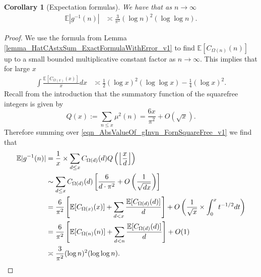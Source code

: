 \documentclass[11pt,reqno,a4letter]{article}
\numberwithin{figure}{section}
\numberwithin{table}{section}
\newcommand{\Floor}[2]{\ensuremath{\left\lfloor \frac{#1}{#2} \right\rfloor}}
\theoremstyle{plain}
\newtheorem{cor}[theorem]{Corollary}
\numberwithin{theorem}{section}
\theoremstyle{definition}
\begin{document}
\begin{cor}[Expectation formulas] 
\label{cor_ExpectationFormulaAbsgInvn_v2} 
We have that as $n \rightarrow \infty$ 
\begin{align*} 
\mathbb{E}|g^{-1}(n)| & \asymp \frac{3}{\pi^2} (\log n)^2 (\log\log n). 
\end{align*} 
\end{cor} 
\begin{proof} 
We use the formula from Lemma \ref{lemma_HatCAstxSum_ExactFormulaWithError_v1} 
to find $\mathbb{E}[C_{\Omega(n)}(n)]$ up to a small bounded multiplicative 
constant factor as $n \rightarrow \infty$.
This implies that for large $x$ 
\begin{align*} 
\int \frac{\mathbb{E}[C_{\Omega(x)}(x)]}{x} dx & \asymp \frac{1}{2} (\log x)^2 (\log\log x) - 
     \frac{1}{4} (\log x)^2. 
\end{align*} 
Recall from the introduction that the summatory function of the 
squarefree integers is given by 
\[
Q(x) := \sum_{n \leq x} \mu^2(n) = \frac{6x}{\pi^2} + O(\sqrt{x}). 
\]
Therefore summing over \eqref{eqn_AbsValueOf_gInvn_FornSquareFree_v1} 
we find that  
\begin{align} 
\notag 
\mathbb{E}|g^{-1}(n)| & = \frac{1}{x} \times \sum_{d \leq x} 
     C_{\Omega(d)}(d) Q\left(\Floor{x}{d}\right) \\ 
\notag 
     & \sim \sum_{d \leq x} C_{\Omega(d)}(d) \left[\frac{6}{d \cdot \pi^2} + O\left(\frac{1}{\sqrt{dx}}\right) 
     \right] \\ 
\notag 
     & = \frac{6}{\pi^2} \left[\mathbb{E}[C_{\Omega(x)}(x)] + \sum_{d<x} 
     \frac{\mathbb{E}[C_{\Omega(d)}(d)]}{d}\right] + 
     O\left(\frac{1}{\sqrt{x}} \times \int_0^{x} t^{-1/2} dt\right) \\ 
\label{eqn_proof_tag_ExpAbsgInvn_ExpandedByExpsOfCkn_v1} 
     & = \frac{6}{\pi^2}\left[\mathbb{E}[C_{\Omega(n)}(n)] + 
     \sum_{d<n} \frac{\mathbb{E}[C_{\Omega(d)}(d)]}{d}\right] + O(1) \\ 
\notag 
     & \asymp \frac{3}{\pi^2} (\log n)^2 (\log\log n). 
     \qedhere 
\end{align} 
\end{proof} 
\end{document}
